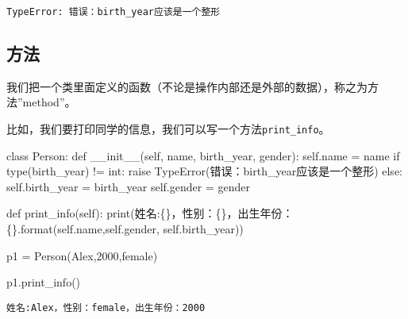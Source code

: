 \documentclass[
  letterpaper,
  DIV=11,
  numbers=noendperiod]{scrreprt}
\newenvironment{Shaded}{\begin{snugshade}}{\end{snugshade}}
\newcommand{\BuiltInTok}[1]{\textcolor[rgb]{0.00,0.23,0.31}{#1}}
\newcommand{\ControlFlowTok}[1]{\textcolor[rgb]{0.00,0.23,0.31}{#1}}
\newcommand{\DecValTok}[1]{\textcolor[rgb]{0.68,0.00,0.00}{#1}}
\newcommand{\FunctionTok}[1]{\textcolor[rgb]{0.28,0.35,0.67}{#1}}
\newcommand{\KeywordTok}[1]{\textcolor[rgb]{0.00,0.23,0.31}{#1}}
\newcommand{\NormalTok}[1]{\textcolor[rgb]{0.00,0.23,0.31}{#1}}
\newcommand{\OperatorTok}[1]{\textcolor[rgb]{0.37,0.37,0.37}{#1}}
\newcommand{\PreprocessorTok}[1]{\textcolor[rgb]{0.68,0.00,0.00}{#1}}
\newcommand{\SpecialCharTok}[1]{\textcolor[rgb]{0.37,0.37,0.37}{#1}}
\newcommand{\StringTok}[1]{\textcolor[rgb]{0.13,0.47,0.30}{#1}}
\newcommand{\VariableTok}[1]{\textcolor[rgb]{0.07,0.07,0.07}{#1}}
\begin{document}
\begin{verbatim}
TypeError: 错误：birth_year应该是一个整形
\end{verbatim}

\hypertarget{ux65b9ux6cd5}{%
\subsection{方法}\label{ux65b9ux6cd5}}

我们把一个类里面定义的函数（不论是操作内部还是外部的数据），称之为方法''method''。

比如，我们要打印同学的信息，我们可以写一个方法\texttt{print\_info}。

\begin{Shaded}
\begin{Highlighting}[]
\KeywordTok{class}\NormalTok{ Person:}
    \KeywordTok{def} \FunctionTok{\_\_init\_\_}\NormalTok{(}\VariableTok{self}\NormalTok{, name, birth\_year, gender):}
        \VariableTok{self}\NormalTok{.name }\OperatorTok{=}\NormalTok{ name}
        \ControlFlowTok{if} \BuiltInTok{type}\NormalTok{(birth\_year) }\OperatorTok{!=} \BuiltInTok{int}\NormalTok{:}
            \ControlFlowTok{raise} \PreprocessorTok{TypeError}\NormalTok{(}\StringTok{\textquotesingle{}错误：birth\_year应该是一个整形\textquotesingle{}}\NormalTok{)}
        \ControlFlowTok{else}\NormalTok{:}
            \VariableTok{self}\NormalTok{.birth\_year }\OperatorTok{=}\NormalTok{ birth\_year}
        \VariableTok{self}\NormalTok{.gender }\OperatorTok{=}\NormalTok{ gender}

    \KeywordTok{def}\NormalTok{ print\_info(}\VariableTok{self}\NormalTok{):}
        \BuiltInTok{print}\NormalTok{(}\StringTok{\textquotesingle{}姓名:}\SpecialCharTok{\{\}}\StringTok{，性别：}\SpecialCharTok{\{\}}\StringTok{，出生年份：}\SpecialCharTok{\{\}}\StringTok{\textquotesingle{}}\NormalTok{.}\BuiltInTok{format}\NormalTok{(}\VariableTok{self}\NormalTok{.name,}\VariableTok{self}\NormalTok{.gender,}
        \VariableTok{self}\NormalTok{.birth\_year))}
    
\NormalTok{p1 }\OperatorTok{=}\NormalTok{ Person(}\StringTok{\textquotesingle{}Alex\textquotesingle{}}\NormalTok{,}\DecValTok{2000}\NormalTok{,}\StringTok{\textquotesingle{}female\textquotesingle{}}\NormalTok{)}

\NormalTok{p1.print\_info()}
\end{Highlighting}
\end{Shaded}

\begin{verbatim}
姓名:Alex，性别：female，出生年份：2000
\end{verbatim}
\end{document}
